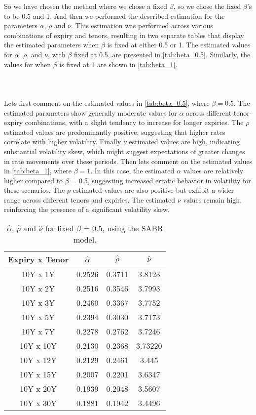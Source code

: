 \noindent
So we have chosen the method where we chose a fixed $\beta$, so we chose the fixed $\beta$'s to be 0.5 and 1.
And then we performed the described estimation for the parameters $\alpha$, $\rho$ and $\nu$. 
This estimation was performed across various combinations of expiry and tenors, 
resulting in two separate tables that display the estimated parameters when $\beta$ is fixed at either 0.5 or 1. 
The estimated values for $\alpha$, $\rho$, and $\nu$, with $\beta$ fixed at 0.5, are presented in \autoref{tab:beta_0.5}. 
Similarly, the values for when $\beta$ is fixed at 1 are shown in \autoref{tab:beta_1}.
\\\\
\\\\
Lets first comment on the estimated values in  \autoref{tab:beta_0.5}, where $\beta=0.5$.
The estimated parameters show generally moderate values for $\alpha$ across different tenor-expiry combinations, 
with a slight tendency to increase for longer expiries. The $\rho$ estimated values are predominantly positive, 
suggesting that higher rates correlate with higher volatility. Finally $\nu$  estimated values are high, 
indicating substantial volatility skew, which might suggest expectations of greater changes in 
rate movements over these periods. Then lets comment on the estimated values in \autoref{tab:beta_1}, where $\beta=1$.
In this case, the estimated $\alpha$ values are relatively higher compared to $\beta$ = 0.5, suggesting increased erratic behavior in volatility 
for these scenarios. The $\rho$ estimated  values are also positive but exhibit a wider range across different tenors and expiries. 
The estimated $\nu$ values remain high, reinforcing the presence of a significant volatility skew.
\\
\begin{table}[H]
    \centering
    \begin{tabular}{cccc}
      \toprule
      \textbf{Expiry x Tenor } & \textbf{$\hat{\alpha}$} & \textbf{$\hat{\rho}$}  & \textbf{$\hat{\nu}$} \\
      \midrule
      \rowcolor{lightgray!40}  10Y x 1Y &0.2526 & 0.3711 & 3.8123 \\
      10Y x 2Y &0.2516 & 0.3546 & 3.7993 \\
      \rowcolor{lightgray!40}  10Y x 3Y  &0.2460 & 0.3367 & 3.7752 \\
      10Y x 5Y &0.2394 & 0.3030 & 3.7173 \\
      \rowcolor{lightgray!40} 10Y x 7Y &0.2278 & 0.2762 & 3.7246 \\
      10Y x 10Y &0.2130& 0.2368 & 3.73220 \\
      \rowcolor{lightgray!40}  10Y x 12Y &0.2129 & 0.2461& 3.445 \\
      10Y x 15Y &0.2007 & 0.2201 & 3.6347 \\
      \rowcolor{lightgray!40} 10Y x 20Y &0.1939 & 0.2048 & 3.5607 \\
      10Y x 30Y &0.1881 & 0.1942 & 3.4496 \\
      \bottomrule
    \end{tabular}
    \caption{$\hat{\alpha}$, $\hat{\rho}$ and $\hat{\nu}$ for fixed $\beta$ = 0.5, using the SABR model.}
    \label{tab:beta_0.5}
\end{table}
